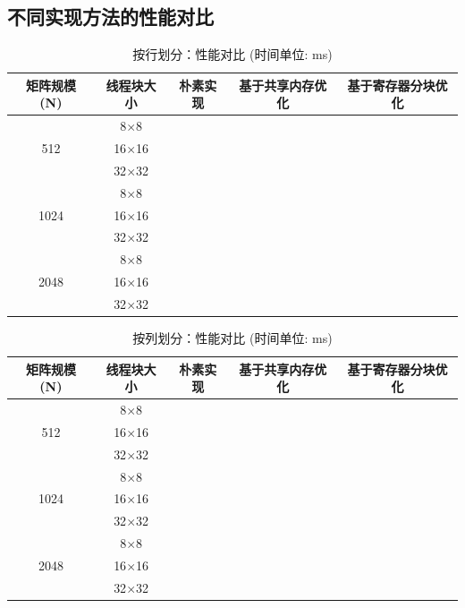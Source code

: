 \documentclass{SYSUReport}
\begin{document}
\subsection{不同实现方法的性能对比}
\begin{table}[H] %
\centering
\caption{按行划分：性能对比 (时间单位: ms)}
\label{tab:perf_combined}
\begin{tabular}{|c|c|c|c|c|}
\hline
矩阵规模 (N) & 线程块大小 & 朴素实现 & 基于共享内存优化 & 基于寄存器分块优化 \\
\hline
\multirow{3}{*}{512} & 8$\times$8 &       &       &       \\ %
\cline{2-5}
& 16$\times$16 &       &       &       \\
\cline{2-5}
& 32$\times$32 &       &       &       \\
\hline
\multirow{3}{*}{1024} & 8$\times$8 &       &       &       \\
\cline{2-5}
& 16$\times$16 &       &       &       \\
\cline{2-5}
& 32$\times$32 &       &       &       \\
\hline
\multirow{3}{*}{2048} & 8$\times$8 &       &       &       \\
\cline{2-5}
& 16$\times$16 &       &       &       \\
\cline{2-5}
& 32$\times$32 &       &       &       \\
\hline
\end{tabular}
\end{table}
\begin{table}[H] %
\centering
\caption{按列划分：性能对比 (时间单位: ms)}
\label{tab:perf_column}
\begin{tabular}{|c|c|c|c|c|}
\hline
矩阵规模 (N) & 线程块大小 & 朴素实现 & 基于共享内存优化 & 基于寄存器分块优化 \\
\hline
\multirow{3}{*}{512} & 8$\times$8 &       &       &       \\ %
\cline{2-5}
& 16$\times$16 &       &       &       \\
\cline{2-5}
& 32$\times$32 &       &       &       \\
\hline
\multirow{3}{*}{1024} & 8$\times$8 &       &       &       \\
\cline{2-5}
& 16$\times$16 &       &       &       \\
\cline{2-5}
& 32$\times$32 &       &       &       \\
\hline
\multirow{3}{*}{2048} & 8$\times$8 &       &       &       \\
\cline{2-5}
& 16$\times$16 &       &       &       \\
\cline{2-5}
& 32$\times$32 &       &       &       \\
\hline
\end{tabular}
\end{table}
\end{document}
